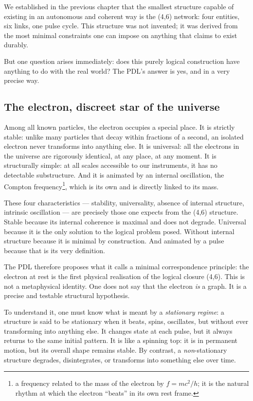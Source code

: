 \documentclass[12pt, a4paper, openright]{book}
\begin{document}
We established in the previous chapter that the smallest structure capable of existing in an autonomous and coherent way is the (4,6) network: four entities, six links, one pulse cycle. This structure was not invented; it was derived from the most minimal constraints one can impose on anything that claims to exist durably.

\medskip

But one question arises immediately: does this purely logical construction have anything to do with the real world? The PDL’s answer is yes, and in a very precise way.

\subsection*{The electron, discreet star of the universe}

Among all known particles, the electron occupies a special place. It is strictly stable: unlike many particles that decay within fractions of a second, an isolated electron never transforms into anything else. It is universal: all the electrons in the universe are rigorously identical, at any place, at any moment. It is structurally simple: at all scales accessible to our instruments, it has no detectable substructure. And it is animated by an internal oscillation, the Compton frequency\footnote{a frequency related to the mass of the electron by $f = mc^2/h$; it is the natural rhythm at which the electron “beats” in its own rest frame.}, which is its own and is directly linked to its mass.

\medskip

These four characteristics — stability, universality, absence of internal structure, intrinsic oscillation — are precisely those one expects from the (4,6) structure. Stable because its internal coherence is maximal and does not degrade. Universal because it is the only solution to the logical problem posed. Without internal structure because it is minimal by construction. And animated by a pulse because that is its very definition.

\medskip

The PDL therefore proposes what it calls a minimal correspondence principle: the electron at rest is the first physical realisation of the logical closure (4,6). This is not a metaphysical identity. One does not say that the electron \emph{is} a graph. It is a precise and testable structural hypothesis.

\medskip

To understand it, one must know what is meant by a \emph{stationary regime}: a structure is said to be stationary when it beats, spins, oscillates, but without ever transforming into anything else. It changes state at each pulse, but it always returns to the same initial pattern. It is like a spinning top: it is in permanent motion, but its overall shape remains stable. By contrast, a \emph{non}-stationary structure degrades, disintegrates, or transforms into something else over time.
\end{document}
